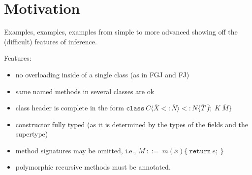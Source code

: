 \section{Motivation}
\label{sec:motivation}

Examples, examples, examples from simple to more advanced showing off
the (difficult) features of inference.

Features:
\begin{itemize}
\item no overloading inside of a single class (as in FGJ and FJ)
\item same named methods in several classes are ok
\item class header is complete in the form
  $\mathtt{class}\ C\langle\overline X <: \overline N\rangle <: N \{
  \overline T\ \overline f;\ K\ \overline M \}$
\item constructor fully typed (as it is determined by the types of the
  fields and the supertype)
\item method signatures may be omitted, i.e., 
  $M\ ::=\ m(\overline x) \{ \ \mathtt{return}\ e;\ \}$
\item polymorphic recursive methods must be annotated.
\end{itemize}


